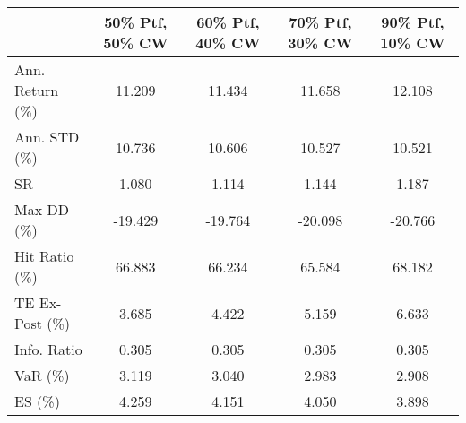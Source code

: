 \begin{tabular}{lcccc}
\toprule
{} &  50\% Ptf, 50\% CW &  60\% Ptf, 40\% CW &  70\% Ptf, 30\% CW &  90\% Ptf, 10\% CW \\
\midrule
Ann. Return (\%) &           11.209 &           11.434 &           11.658 &           12.108 \\
Ann. STD (\%)    &           10.736 &           10.606 &           10.527 &           10.521 \\
SR              &            1.080 &            1.114 &            1.144 &            1.187 \\
Max DD (\%)      &          -19.429 &          -19.764 &          -20.098 &          -20.766 \\
Hit Ratio (\%)   &           66.883 &           66.234 &           65.584 &           68.182 \\
TE Ex-Post (\%)  &            3.685 &            4.422 &            5.159 &            6.633 \\
Info. Ratio     &            0.305 &            0.305 &            0.305 &            0.305 \\
VaR (\%)         &            3.119 &            3.040 &            2.983 &            2.908 \\
ES (\%)          &            4.259 &            4.151 &            4.050 &            3.898 \\
\bottomrule
\end{tabular}
